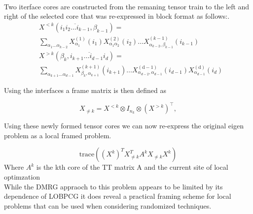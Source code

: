 \documentclass[%
 aip,12pt
 amsmath,amssymb,
 reprint,%
]{revtex4-1}
\begin{document}
\\
Two iterface cores are constructed from the remaning tensor train to the left and right of the selected core that was re-expressed in block format as follows:.
\begin{equation}
\begin{split}
&X^{<k}\left(\overline{i_{1} i_{2} \ldots i_{k-1}}, \beta_{k-1}\right)=
\\
&\sum_{\alpha_{1} \ldots \alpha_{k-2}} X_{\alpha_{1}}^{(1)}\left(i_{1}\right) X_{\alpha_{1} \alpha_{2}}^{(2)}\left(i_{2}\right) \ldots X_{\alpha_{k-2}, \beta_{k-1}}^{(k-1)}\left(i_{k-1}\right) \\
&X^{>k}\left(\beta_{k}, \overline{i_{k+1} \ldots i_{d-1} i_{d}}\right)=
\\
&\sum_{\alpha_{k+1} \ldots \alpha_{d-1}} X_{\beta_{k}, \alpha_{k+1}}^{(k+1)}\left(i_{k+1}\right) \ldots X_{\alpha_{d-2}, \alpha_{d-1}}^{(\mathrm{d}-1)}\left(i_{d-1}\right) X_{\alpha_{d-1}}^{(\mathrm{d})}\left(i_{d}\right)
  \end{split}
  \end{equation}

Using the interfaces a frame matrix is then defined as

\begin{equation}
  X_{\neq k}=X^{<k} \otimes I_{n_{k}} \otimes\left(X^{>k}\right)^{\top},
\end{equation}

Using these newly formed tensor cores we can now re-express the original eigen problem as a local framed problem.

\begin{equation}
  \text{trace}((X^k)^TX_{\neq k}^TA^kX_{\neq k}X^k)
\end{equation}
Where $A^k$ is the kth core of the TT matrix A and the current site of local optimzation\\

While the DMRG appraoch to this problem appears to be limited by its dependence of LOBPCG it does reveal a practical framing scheme for local problems that can be used when considering randomized techniques.
\end{document}
